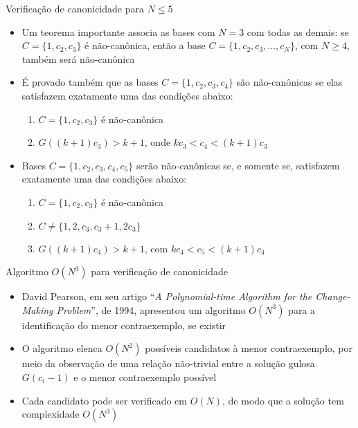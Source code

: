 \begin{frame}[fragile]{Verificação de canonicidade para $N \leq 5$}

    \begin{itemize}
        \item Um teorema importante associa as bases com $N = 3$ com todas as demais: se 
            $C = \{ 1, c_2, c_3 \}$ é não-canônica, então a base $C = \{ 1, c_2, c_3, \ldots,
                c_N \}$, com $N \geq 4$, também será não-canônica

        \item É provado também que as bases $C = \{ 1, c_2, c_3, c_4 \}$ são não-canônicas se elas
            satisfazem exatamente uma das condições abaixo:
        \begin{enumerate}
            \item $C = \{ 1, c_2, c_3 \}$ é não-canônica
            \item $G((k+1)c_3) > k + 1$, onde $kc_3 < c_4 < (k + 1)c_3$
        \end{enumerate}
        
        \item Bases $C = \{ 1, c_2, c_3, c_4, c_5 \}$ serão não-canônicas se, e somente se, 
            satisfazem exatamente uma das condições abaixo:
        \begin{enumerate}
            \item $C = \{ 1, c_2, c_3 \}$ é não-canônica
            \item $C \neq \{ 1, 2, c_3, c_3 + 1, 2c_3 \}$
            \item $G((k + 1)c_4) > k + 1$, com $kc_4 < c_5 < (k + 1)c_4$
        \end{enumerate}
    \end{itemize}

\end{frame}

\begin{frame}[fragile]{Algoritmo $O(N^3)$ para verificação de canonicidade}

    \begin{itemize}
        \item David Pearson, em seu artigo ``\textit{A Polynomial-time Algorithm for the
            Change-Making Problem}'', de 1994, apresentou um algoritmo $O(N^3)$ para a identificação
            do menor contraexemplo, se existir

        \item O algoritmo elenca $O(N^2)$ possíveis candidatos à menor contraexemplo, por meio
            da observação de uma relação não-trivial entre a solução gulosa $G(c_i - 1)$ e o menor
            contraexemplo possível

        \item Cada candidato pode ser verificado em $O(N)$, de modo que a solução tem complexidade
            $O(N^3)$

    \end{itemize}

\end{frame}

